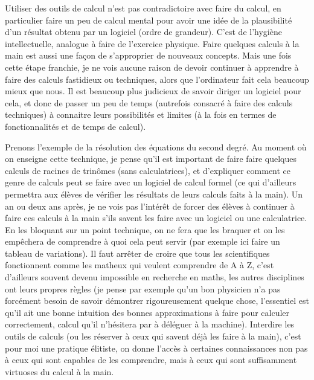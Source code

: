 \documentclass[a4paper,11pt]{article}
\begin{document}
\begin{giacjshere}
Utiliser des outils de calcul n'est pas contradictoire avec faire
du calcul, en particulier faire un peu de calcul mental pour avoir
une id\'ee de la plausibilit\'e d'un r\'esultat obtenu par
un logiciel (ordre de grandeur). C'est
de l'hygi\`ene intellectuelle, analogue \`a faire de l'exercice
physique. Faire quelques calculs \`a la main est aussi une
fa\c{c}on de s'approprier de nouveaux concepts. Mais une fois
cette \'etape franchie, je ne vois aucune raison de devoir
continuer \`a apprendre \`a faire des calculs fastidieux
ou techniques, alors que l'ordinateur fait cela beaucoup mieux
que nous. Il est beaucoup plus judicieux de savoir diriger
un logiciel pour cela, et donc de passer un peu de temps
(autrefois consacr\'e \`a faire des calculs techniques)
\`a connaitre leurs possibilit\'es
et limites (\`a la fois en termes de fonctionnalit\'es et
de temps de calcul).

Prenons l'exemple de la r\'esolution des \'equations du second
degr\'e. Au moment o\`u on enseigne cette technique, je pense
qu'il est important de faire faire quelques calculs de racines 
de trin\^omes (sans
calculatrices), et d'expliquer comment ce genre de calculs peut
se faire avec un logiciel de calcul formel (ce qui d'ailleurs
permettra aux \'el\`eves de v\'erifier les r\'esultats
de leurs calculs faits \`a la main).
Un an ou deux ans apr\`es, je ne vois pas l'int\'er\^et de forcer
des \'el\`eves \`a continuer \`a faire ces calculs \`a la main
s'ils savent les faire avec un logiciel ou une calculatrice. En les
bloquant sur un point technique, on ne fera
que les braquer et on les emp\^echera de comprendre \`a quoi
cela peut servir (par exemple ici faire un tableau de variations).
Il faut arr\^eter de croire que tous les
scientifiques fonctionnent comme les matheux qui veulent
comprendre de A \`a Z, c'est d'ailleurs souvent devenu
impossible en recherche en maths, les autres disciplines
ont leurs propres r\`egles (je pense par exemple qu'un
bon physicien n'a pas forc\'ement besoin de savoir
d\'emontrer rigoureusement quelque chose, l'essentiel
est qu'il ait une bonne intuition des bonnes approximations
\`a faire pour calculer correctement, calcul qu'il n'h\'esitera
par \`a d\'el\'eguer \`a la machine). Interdire les outils
de calculs (ou les r\'eserver \`a ceux qui savent d\'ej\`a
les faire \`a la main), c'est pour moi une pratique \'elitiste,
on donne l'acc\`es \`a certaines connaissances non pas
\`a ceux qui sont capables de les comprendre, mais \`a
ceux qui sont suffisamment virtuoses du calcul \`a la main.


\end{giacjshere}
\end{document}
